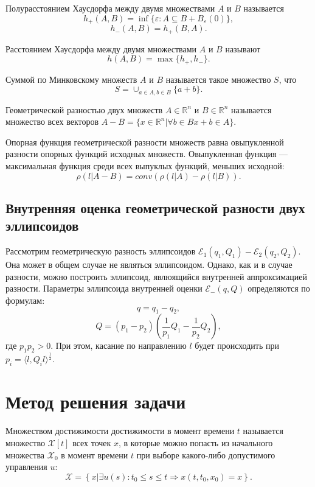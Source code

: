\documentclass[12pt]{article}
\begin{document}
	\begin{definition}
		Полурасстоянием Хаусдорфа между двумя множествами $A$ и $B$ называется 
		$$
			h_{+} (A, B) = \inf \{ \varepsilon : A \subseteq B + B_{\varepsilon} (0) \}, 
		$$
		$$
			h_{-} (A, B) = h_{+} (B, A).
		$$
	\end{definition}
	
	\begin{definition}
		Расстоянием Хаусдорфа между двумя множествами $A$ и $B$ называют
		$$
			h (A, B) = \max \{ h_{+}, h_{-} \}.
		$$
	\end{definition}
	
	\begin{definition}
		Суммой по Минковскому множеств $A$ и $B$ называется такое множество $S$, что
		$$
			S = \cup_{a \in A, b \in B} \{a + b\}.
		$$
	\end{definition}
	
	\begin{definition}
		Геометрической разностью двух множеств $A \in \mathbb{R}^n$ и $B \in \mathbb{R}^n$ называется множество всех векторов $A - B = \{ x \in \mathbb{R}^n | \forall b \in B x + b \in A \}$. 
	\end{definition}
	Опорная функция геометрической разности множеств равна овыпукленной разности опорных функций исходных множеств. Овыпукленная функция --- максимальная функция среди всех выпуклых функций, меньших исходной:
	$$
		\rho (l | A - B) = conv (\rho (l | A) - \rho (l | B)).
	$$
			
		\subsection{Внутренняя оценка геометрической разности двух эллипсоидов}
		Рассмотрим геометрическую разность эллипсоидов $\mathcal{E}_1(q_1, Q_1) - \mathcal{E}_2(q_2, Q_2)$. Она может в общем случае не являться эллипсоидом. Однако, как и в случае разности, можно построить эллипсоид, явлюящийся внутренней аппроксимацией разности.
		Параметры эллипсоида внутренней оценки $\mathcal{E}_{-} (q, Q)$ определяются по формулам:
		$$
			q = q_1 - q_2, 
		$$
		$$
			Q = (p_1 - p_2) \left( \dfrac{1}{p_1} Q_1 - \dfrac{1}{p_2} Q_2 \right),
		$$
		где $p_1 p_2 > 0$. При этом, касание по направлению $l$ будет происходить при $p_i = \langle l, Q_i l \rangle^{\frac{1}{2}}$.
	
	\section{Метод решения задачи}
		\begin{definition}
			Множеством достижимости достижимости в момент времени $t$ называется множество $\mathcal{X} [t]$ всех точек $x$, в которые можно попасть из начального множества $\mathcal{X}_0$ в момент времени $t$ при выборе какого-либо допустимого управления $u$:
			$$
				\mathcal{X} = \left\{ x | \exists u(s) : t_0 \leqslant s \leqslant t \Rightarrow x(t, t_0, x_0) = x \right\}.
			$$
		\end{definition}	
		
\end{document}
